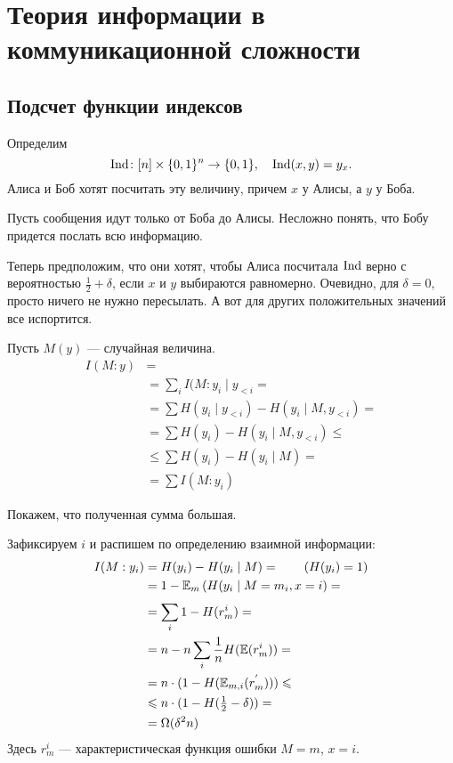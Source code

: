 \section{Теория информации в коммуникационной сложности}
\subsection{Подсчет функции индексов}
Определим \[
	\operatorname{Ind} \colon [n]\times \{0, 1\}^{n} \to \{0, 1\}, \quad \operatorname{Ind}(x, y) = y_x
.\] 
Алиса и Боб хотят посчитать эту величину, причем $ x$ у Алисы, а  $ y $ у Боба.

Пусть сообщения идут только от Боба до Алисы. Несложно понять, что Бобу придется послать всю информацию.

Теперь предположим, что они хотят, чтобы Алиса посчитала $ \operatorname{Ind}$  верно с вероятностью $ \frac{1}{2} + \delta $, если $ x$ и $ y$ выбираются равномерно. Очевидно, для $  \delta  = 0$, просто ничего не нужно пересылать. А вот для других положительных значений все испортится.


\dotfill


Пусть $ M(y)$ --- случайная величина.  
\begin{align*}
	I(M : y)& = \tag{Chain rule} \\
			&= \sum_{i}^{} I(M: y_i \mid y_{<i} = \\
			&= \sum H(y_i \mid y_{<i}) - H(y_i \mid M, y_{<i}) = \tag{$ y_i$ независимы} \\
			&= \sum H(y_i) - H(y_i \mid M, y_{<i}) \le \tag{Выкинули часть условий} \\
			& \le \sum H(y_i) - H(y_i \mid M) = \\
			&= \sum I(M : y_i)
\end{align*}

Покажем, что полученная сумма большая.

Зафиксируем $ i$ и распишем по определению взаимной информации: 
\begin{align*}
	I(M : y_i) &= H(y_i) - H(y_i \mid M) = \tag{$ H(y_i) = 1$} \\
			   &= 1 - \mathbb{E} _{m} \left( H(y_i \mid M= m_i, x= i \right)  = \\
			   &= \sum_{i}^{} 1 - H(r_m^{i}) =  \\
			   &= n - n \sum_{i}^{} \frac{1}{n} H(\mathbb{E}(r_m^{i})) = \\
			   &= n \cdot (1 - H(\mathbb{E}_{m, i} (r_m^{'}))) \leqslant  \\
			   & \leqslant  n \cdot  (1 - H(\tfrac{1}{2} - \delta )) = \\
			   &= \Omega ( \delta ^2 n)
\end{align*}
Здесь $ r_m^{i} $ --- характеристическая функция ошибки  $ M=m$,  $ x = i$.

